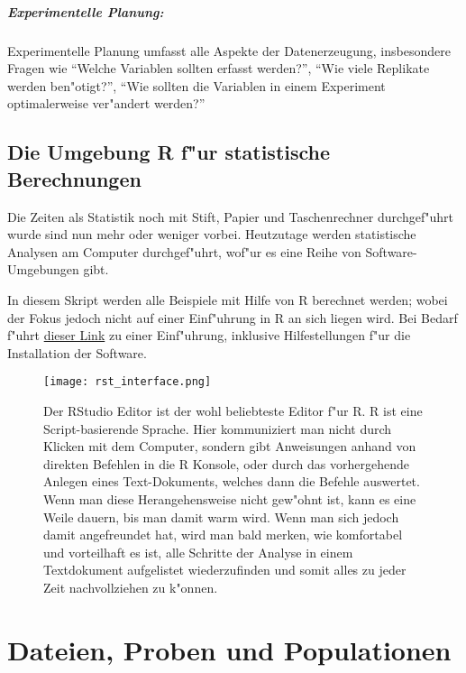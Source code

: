 \documentclass[a4paper,twoside]{tufte-book}\usepackage[]{graphicx}\usepackage[]{color}
\begin{document}
	\paragraph{Experimentelle Planung:} Experimentelle Planung umfasst alle Aspekte der Datenerzeugung, insbesondere Fragen wie "`Welche Variablen sollten erfasst werden?"', "`Wie viele Replikate werden ben"otigt?"', "`Wie sollten die Variablen in einem Experiment optimalerweise ver"andert werden?"'
	
	
	\section{Die Umgebung R f"ur statistische Berechnungen}
	
	Die Zeiten als Statistik noch mit Stift, Papier und Taschenrechner durchgef"uhrt wurde sind nun mehr oder weniger vorbei. Heutzutage werden statistische Analysen am Computer durchgef"uhrt, wof"ur es eine Reihe von Software-Umgebungen gibt.
	
	In diesem Skript werden alle Beispiele mit Hilfe von R berechnet werden; wobei der Fokus jedoch nicht auf einer Einf"uhrung in R an sich liegen wird. Bei Bedarf f"uhrt  \href{http://biometry.github.io/APES/R/R10-gettingStarted.html}{dieser Link} zu einer Einf"uhrung, inklusive Hilfestellungen f"ur die Installation der Software.
	
	\begin{figure}[]
		\begin{center}
			\texttt{[image: rst\_interface.png]}
			\caption{Der RStudio Editor ist der wohl beliebteste Editor f"ur R. R ist eine Script-basierende Sprache. Hier kommuniziert man nicht durch Klicken mit dem Computer, sondern gibt Anweisungen anhand von direkten Befehlen in die R Konsole, oder durch das vorhergehende Anlegen eines Text-Dokuments, welches dann die Befehle auswertet. Wenn man diese Herangehensweise nicht gew"ohnt ist, kann es eine Weile dauern, bis man damit warm wird. Wenn man sich jedoch damit angefreundet hat, wird man bald merken, wie komfortabel und vorteilhaft es ist, alle Schritte der Analyse in einem Textdokument aufgelistet wiederzufinden und somit alles zu jeder Zeit nachvollziehen zu k"onnen.}
			\label{fig: Rstudio}
		\end{center}
	\end{figure}
	
	
	
	\chapter{Dateien, Proben und Populationen}
	
\end{document}

